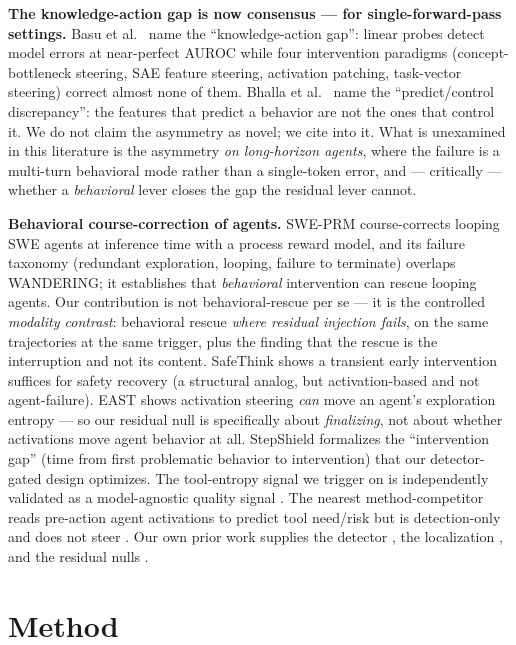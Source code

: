 \documentclass[11pt]{article}
\begin{document}
\textbf{The knowledge-action gap is now consensus --- for single-forward-pass settings.} Basu et al.\ \cite{basu_kag} name the ``knowledge-action gap'': linear probes detect model errors at near-perfect AUROC while four intervention paradigms (concept-bottleneck steering, SAE feature steering, activation patching, task-vector steering) correct almost none of them. Bhalla et al.\ \cite{bhalla_pc} name the ``predict/control discrepancy'': the features that predict a behavior are not the ones that control it. We do not claim the asymmetry as novel; we cite into it. What is unexamined in this literature is the asymmetry \emph{on long-horizon agents}, where the failure is a multi-turn behavioral mode rather than a single-token error, and --- critically --- whether a \emph{behavioral} lever closes the gap the residual lever cannot.

\textbf{Behavioral course-correction of agents.} SWE-PRM \cite{swe_prm} course-corrects looping SWE agents at inference time with a process reward model, and its failure taxonomy (redundant exploration, looping, failure to terminate) overlaps WANDERING; it establishes that \emph{behavioral} intervention can rescue looping agents. Our contribution is not behavioral-rescue per se --- it is the controlled \emph{modality contrast}: behavioral rescue \emph{where residual injection fails}, on the same trajectories at the same trigger, plus the finding that the rescue is the interruption and not its content. SafeThink \cite{safethink} shows a transient early intervention suffices for safety recovery (a structural analog, but activation-based and not agent-failure). EAST \cite{east} shows activation steering \emph{can} move an agent's exploration entropy --- so our residual null is specifically about \emph{finalizing}, not about whether activations move agent behavior at all. StepShield \cite{stepshield} formalizes the ``intervention gap'' (time from first problematic behavior to intervention) that our detector-gated design optimizes. The tool-entropy signal we trigger on is independently validated as a model-agnostic quality signal \cite{tool_entropy_train}. The nearest method-competitor reads pre-action agent activations to predict tool need/risk but is detection-only and does not steer \cite{tatsat}. Our own prior work supplies the detector \cite{tool_entropy}, the localization \cite{multichannel}, and the residual nulls \cite{residual_nulls}.

\section{Method}\label{sec:method}
\end{document}
